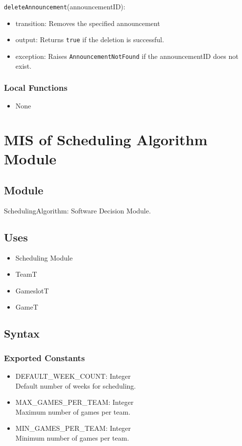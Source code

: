 \documentclass[12pt, titlepage]{article}
\begin{document}
\noindent \texttt{deleteAnnouncement}(announcementID):  
\begin{itemize}
    \item transition: Removes the specified announcement
    \item output: Returns \texttt{true} if the deletion is successful.
    \item exception: Raises \texttt{AnnouncementNotFound} if the announcementID does not exist.
\end{itemize}

\subsubsection{Local Functions}
\begin{itemize}
    \item None
\end{itemize}

\newpage

\section{MIS of Scheduling Algorithm Module} \label{SchedulingAlgorithmModule}

\subsection{Module}
SchedulingAlgorithm: Software Decision Module.

\subsection{Uses}
\begin{itemize}
  \item Scheduling Module
  \item TeamT
  \item GameslotT
  \item GameT
\end{itemize}

\subsection{Syntax}

\subsubsection{Exported Constants}
\begin{itemize}
  \item DEFAULT\_WEEK\_COUNT: Integer \\ Default number of weeks for scheduling.
  \item MAX\_GAMES\_PER\_TEAM: Integer \\ Maximum number of games per team.
  \item MIN\_GAMES\_PER\_TEAM: Integer \\ Minimum number of games per team.
\end{itemize}
\end{document}
